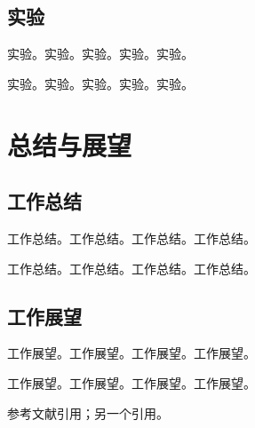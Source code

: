     \section{实验}
    实验。实验。实验。实验。实验。

    实验。实验。实验。实验。实验。

    \chapter{总结与展望}
    \thispagestyle{mainstyle} %
    \section{工作总结}
    工作总结。工作总结。工作总结。工作总结。

    工作总结。工作总结。工作总结。工作总结。

    \section{工作展望}
    工作展望。工作展望。工作展望。工作展望。

    工作展望。工作展望。工作展望。工作展望。
    
    参考文献引用\cite{lamport1994latex}；另一个引用\cite{王夫之1977周易外传}。
